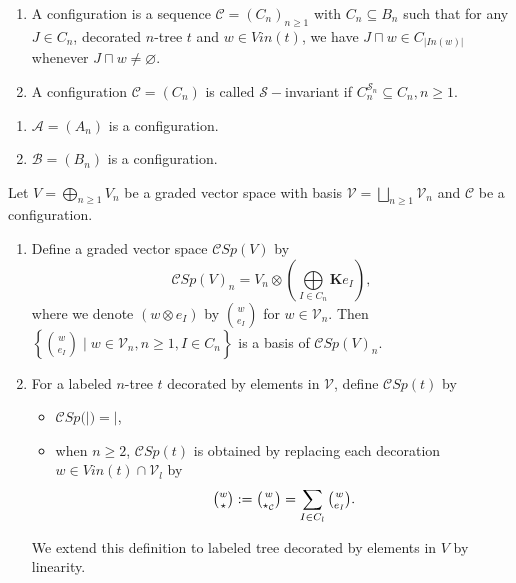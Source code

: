 \documentclass[11pt, twoside]{article}
\begin{document}
\begin{defi}
    \begin{enumerate}
        \item A configuration is a sequence $\mathcal{C}=(C_n)_{n\geq 1}$ with $C_n\subseteq B_n$ such that for any $J\in C_n$, decorated $n$-tree $t$ and $w\in Vin(t)$, we have $J\sqcap w\in C_{\left | In(w)\right |} $ whenever $J\sqcap w\neq \varnothing $.
        \item A configuration $\mathcal{C}=(C_n)$ is called $\mathcal{S}-$invariant if $C_n^{\mathcal{S}_n}\subseteq C_n, n\geq 1 $.
    \end{enumerate}
\end{defi}

\begin{ex}
  \begin{enumerate}
      \item  $\mathcal{A}=(A_n) $ is a configuration.
      \item $\mathcal{B}=(B_n) $ is a configuration.
  \end{enumerate} 
\end{ex}

\begin{defi}
    Let $V=\bigoplus\limits_{n\geq 1}V_n $ be a graded vector space with basis $\mathcal{V}= \bigsqcup\limits_{n\geq 1}\mathcal{V}_n $ and $\mathcal{C}$ be a configuration. \begin{enumerate}
        \item Define a graded vector space $\mathcal{C}Sp(V) $ by $$\mathcal{C}Sp(V)_n= V_n\otimes (\bigoplus\limits_{I\in C_n}\mathbf{K}e_I), $$ where we denote $(w\otimes e_I) $ by $\binom{w}{e_I} $ for $w\in \mathcal{V}_n$. Then $\left\{\binom{w}{e_I}\mid w\in \mathcal{V}_n,n\geq 1, I\in C_n \right\} $ is a basis of $\mathcal{C}Sp(V)_n $.
        \item For a labeled $n$-tree $t$ decorated by elements in $\mathcal{V} $, define $\mathcal{C}Sp(t) $ by \begin{itemize}
            \item $\mathcal{C}Sp(|)= | $,
            \item when $n\geq 2$, $\mathcal{C}Sp(t) $ is obtained by replacing each decoration $w\in Vin(t)\cap \mathcal{V}_l $ by $$\tbinom{w}{\star}:=\tbinom{w}{\star_\mathcal{C}}= \sum\limits_{I\in C_l}\tbinom{w}{e_I}. $$
        \end{itemize} We extend this definition to labeled tree decorated by elements in $V$ by linearity.
    \end{enumerate}
\end{defi}
\end{document}
